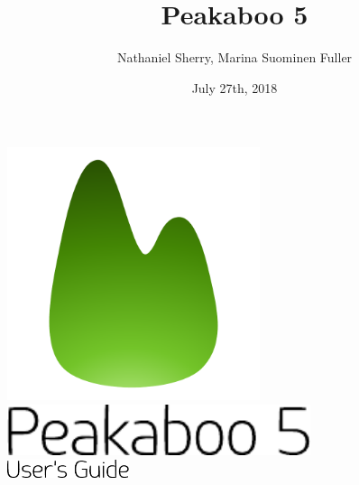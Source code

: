 \documentclass[article,twoside,11pt]{report}
\title{Peakaboo 5}
\date{July 27th, 2018}
\author{Nathaniel Sherry, Marina Suominen Fuller}
\begin{document}
\renewcommand{\headrulewidth}{0pt}
\lhead[]{}
\rhead[]{}


\pagestyle{empty}



\begin{titlepage}
	\vspace*{\fill}
	\centering
	\includegraphics[height=20em]{title/logo.pdf}\\
	\vspace*{1em}
	\includegraphics[height=4em]{title/peakaboo.pdf}\\
	\vspace*{1em}
	\includegraphics[height=1.5em]{title/usersguide.pdf}\\
	\vspace*{\fill}
	\vspace*{\fill}
\end{titlepage}

\cleardoublepage

\pagestyle{empty}
\setcounter{tocdepth}{1}
\tableofcontents
{}
\cleardoublepage
\setcounter{page}{1}
\pagestyle{fancyplain}
\end{document}
